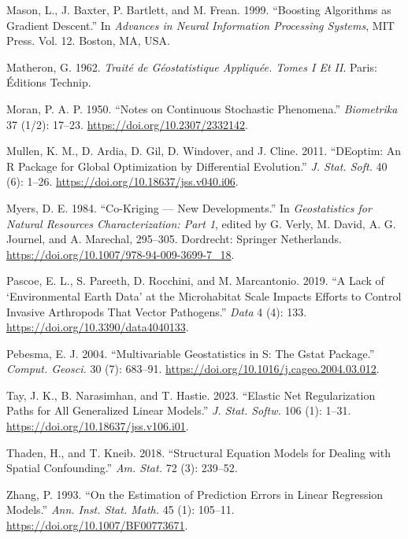 \documentclass[
]{article}
\newlength{\cslhangindent}
\newenvironment{CSLReferences}[2] %
 {\begin{list}{}{%
  \setlength{\itemindent}{0pt}
  \setlength{\leftmargin}{0pt}
  \setlength{\parsep}{0pt}
  \ifodd #1
   \setlength{\leftmargin}{\cslhangindent}
   \setlength{\itemindent}{-1\cslhangindent}
  \fi
  \setlength{\itemsep}{#2\baselineskip}}}
 {\end{list}}
\begin{document}
\begin{CSLReferences}{1}{0}
Mason, L., J. Baxter, P. Bartlett, and M. Frean. 1999. {``Boosting
Algorithms as Gradient Descent.''} In \emph{Advances in Neural
Information Processing Systems}, MIT Press. Vol. 12. Boston, MA, USA.

Matheron, G. 1962. \emph{Traité de Géostatistique Appliquée. Tomes {I}
Et {II}}. Paris: Éditions Technip.

Moran, P. A. P. 1950. {``Notes on Continuous Stochastic Phenomena.''}
\emph{Biometrika} 37 (1/2): 17--23.
\url{https://doi.org/10.2307/2332142}.

Mullen, K. M., D. Ardia, D. Gil, D. Windover, and J. Cline. 2011.
{``{DEoptim}: An {R} Package for Global Optimization by Differential
Evolution.''} \emph{{J. Stat. Soft.}} 40 (6): 1--26.
\url{https://doi.org/10.18637/jss.v040.i06}.

Myers, D. E. 1984. {``Co-Kriging --- New Developments.''} In
\emph{Geostatistics for Natural Resources Characterization: Part 1},
edited by G. Verly, M. David, A. G. Journel, and A. Marechal, 295--305.
Dordrecht: Springer Netherlands.
\url{https://doi.org/10.1007/978-94-009-3699-7_18}.

Pascoe, E. L., S. Pareeth, D. Rocchini, and M. Marcantonio. 2019. {``A
Lack of {`Environmental Earth Data'} at the Microhabitat Scale Impacts
Efforts to Control Invasive {A}rthropods That Vector Pathogens.''}
\emph{Data} 4 (4): 133. \url{https://doi.org/10.3390/data4040133}.

Pebesma, E. J. 2004. {``Multivariable Geostatistics in {S}: The Gstat
Package.''} \emph{Comput. Geosci.} 30 (7): 683--91.
\url{https://doi.org/10.1016/j.cageo.2004.03.012}.

Tay, J. K., B. Narasimhan, and T. Hastie. 2023. {``Elastic Net
Regularization Paths for All Generalized Linear Models.''} \emph{J.
Stat. Softw.} 106 (1): 1--31.
\url{https://doi.org/10.18637/jss.v106.i01}.

Thaden, H., and T. Kneib. 2018. {``Structural Equation Models for
Dealing with Spatial Confounding.''} \emph{Am. Stat.} 72 (3): 239--52.

Zhang, P. 1993. {``On the Estimation of Prediction Errors in Linear
Regression Models.''} \emph{{Ann. Inst. Stat. Math.}} 45 (1): 105--11.
\url{https://doi.org/10.1007/BF00773671}.

\end{CSLReferences}
\end{document}
